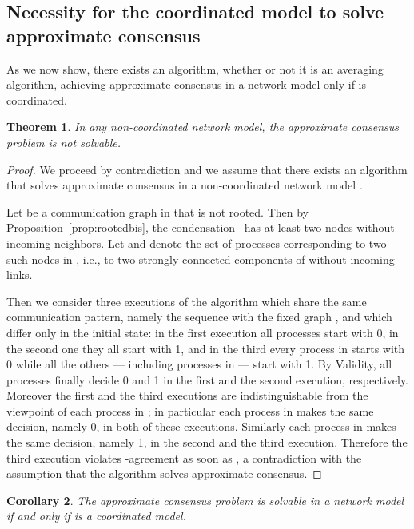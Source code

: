 \documentclass[a4paper]{article}
\theoremstyle{newthm}
\newtheorem{thm}{Theorem}
\newtheorem{cor}[thm]{Corollary}
\begin{document}
\subsection{Necessity for the coordinated model to solve approximate consensus}

As we now show, there exists an algorithm, whether or not it is an averaging algorithm, achieving
	approximate consensus in  a network model  only if   is coordinated.

\begin{thm}\label{thm:noncoord}
In any non-coordinated network model, the approximate consensus problem is not solvable.  
\end{thm}

\begin{proof}
 We proceed by contradiction and we assume that there exists an algorithm that solves
	approximate consensus in a non-coordinated network model .
	
Let  be a communication graph in   that is not rooted.
Then by Proposition~\ref{prop:rootedbis}, the condensation~  has at least two nodes without 
	incoming neighbors.
Let  and  denote the set of processes  corresponding to two such nodes in , i.e., 
	to two strongly connected components of  without incoming links.
	
Then we consider three executions of the algorithm which share the same communication pattern,
	namely the sequence with the fixed graph , and which differ only in the initial state:
	in the first execution all processes start with 0, in the second one they all start with 1, and in 
	the third every  process in  starts with 0 while all the others --- including processes in  ---
	start with 1.
By Validity, all processes finally decide 0 and 1 in the first and the second execution, respectively.
Moreover the first and the third executions are indistinguishable from the viewpoint of each process in ;
	in particular each process in   makes the same decision, namely 0, in both of these executions.
Similarly each process in   makes the same decision, namely 1, in the second and the third execution.
Therefore the third execution violates -agreement as soon as , a contradiction
	with the assumption that  the algorithm solves approximate consensus.
\end{proof}	

\begin{cor}\label{cor:characterization}
The approximate consensus problem is solvable in a network model  if and only if  is 
	a coordinated model.
\end{cor}
\end{document}
